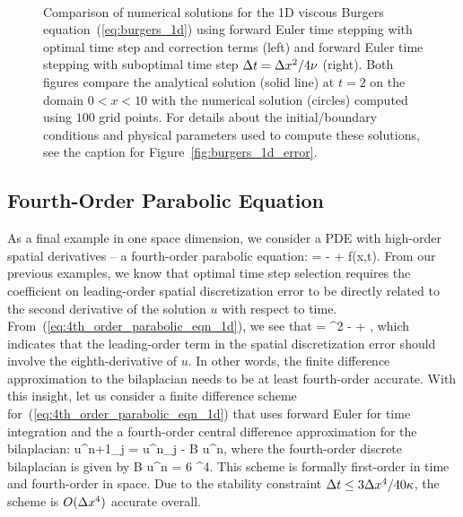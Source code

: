 \documentclass[oneeqnum,onefignum,onetabnum,onethmnum]{siamltex}
\begin{document}
\begin{figure}[tb]
\begin{center}
\ \ \ \ \ 
\caption{Comparison of numerical solutions for the 1D viscous Burgers 
equation~(\ref{eq:burgers_1d}) using forward Euler time stepping with 
optimal time step and correction terms (left) and forward Euler time 
stepping with suboptimal time step $\Delta t = \Delta x^2/4 \nu$ (right).  
Both figures compare the analytical solution (solid line) at $t = 2$ on the 
domain $0 < x < 10$ with the numerical solution (circles) computed using 
$100$ grid points.  
For details about the initial/boundary conditions and physical parameters 
used to compute these solutions, see the caption for 
Figure~\ref{fig:burgers_1d_error}. 
}
\label{fig:burgers_1d_solns}
\end{center}
\end{figure}


\subsection{Fourth-Order Parabolic Equation}
As a final example in one space dimension, we consider a PDE with high-order
spatial derivatives -- a fourth-order parabolic equation: 
\beq
   = -\kappa {} + f(x,t).
  \label{eq:4th_order_parabolic_eqn_1d}
\eeq
From our previous examples, we know that optimal time step selection requires 
the coefficient on leading-order spatial discretization error to be directly 
related to the second derivative of the solution $u$ with respect to time.  
From~(\ref{eq:4th_order_parabolic_eqn_1d}), we see that 
\beq
   = 
    \kappa^2  
  - \kappa {} 
  + 
  \label{eq:4th_order_parabolic_eqn_1d_second_time_derivative},
\eeq
which indicates that the leading-order term in the spatial discretization 
error should involve the eighth-derivative of $u$.  In other words, the
finite difference approximation to the bilaplacian needs to be at least 
fourth-order accurate.  With this insight, let us consider a finite 
difference scheme for~(\ref{eq:4th_order_parabolic_eqn_1d}) that 
uses forward Euler for time integration and the a fourth-order central 
difference approximation for the bilaplacian:
\bea
  u^{n+1}_j = u^{n}_j - \kappa \dt B u^n, 
  \label{eq:4th_order_parabolic_eqn_1d_FD_scheme}
\eea
where the fourth-order discrete bilaplacian is given by
\beq
  B u^n = 
               {6 \dx^4}.
\eeq
This scheme is formally first-order in time and fourth-order in space.  
Due to the stability constraint $\Delta t \le 3\Delta x^4/40 \kappa$, the scheme is 
$O(\Delta x^4)$ accurate overall.
\end{document}
